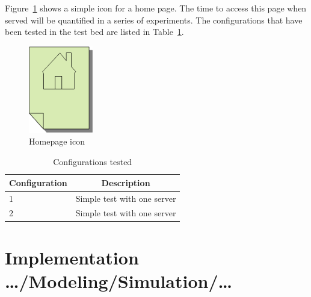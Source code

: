 \documentclass[english, bibtex]{kththesis}
\begin{document}
Figure~\ref{fig:homepageicon} shows a simple icon for a home page. The time
to access this page when served will be quantified in a series of
experiments. The configurations that have been tested in the test bed are
listed in Table~\ref{tab:configstested}.

 
\begin{figure}[!ht]
  \begin{center}
    \includegraphics[width=0.25\textwidth]{figures/Homepage-icon.png}
  \end{center}
  \caption{Homepage icon}
  \label{fig:homepageicon}
\end{figure}

\begin{table}[!ht]
  \begin{center}
    \caption{Configurations tested}
    \label{tab:configstested}
    \begin{tabular}{l|c} %
      \textbf{Configuration} & \textbf{Description} \\
      \hline
      1 & Simple test with one server\\
      2 & Simple test with one server\\
    \end{tabular}
  \end{center}
\end{table}

\section{Implementation …/Modeling/Simulation/…}
\label{sec:implementationDetails}
\end{document}
